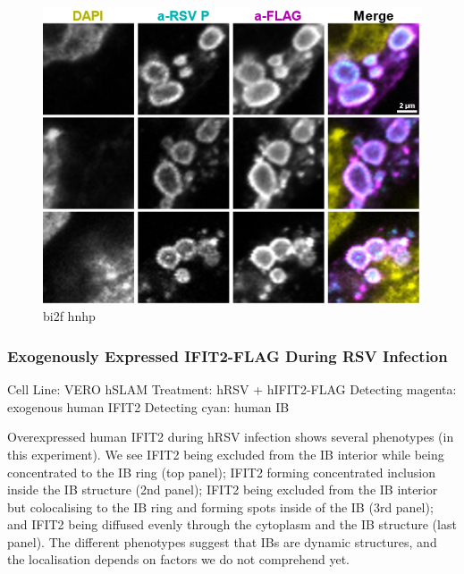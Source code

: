 \begin{figure}
    \centering
    \includegraphics[width=1\linewidth]{09. Chapter 4//Figs//03. IFIT2-FLAG/03. bi2f bnbp.png}
    \caption[bi2f hnhp]{bi2f hnhp}
    \label{bi2f hnhp}
\end{figure}

\subsubsection{Exogenously Expressed IFIT2-FLAG During RSV Infection} \label{Exogenously Expressed IFIT2-FLAG During RSV Infection}
Cell Line: VERO hSLAM \newline
Treatment: hRSV + hIFIT2-FLAG \newline
Detecting magenta: exogenous human IFIT2 \newline
Detecting cyan: human IB \newline

Overexpressed human IFIT2 during hRSV infection shows several phenotypes (in this experiment). We see IFIT2 being excluded from the IB interior while being concentrated to the IB ring (top panel); IFIT2 forming concentrated inclusion inside the IB structure (2nd panel); IFIT2 being excluded from the IB interior but colocalising to the IB ring and forming spots inside of the IB (3rd panel); and IFIT2 being diffused evenly through the cytoplasm and the IB structure (last panel). The different phenotypes suggest that IBs are dynamic structures, and the localisation depends on factors we do not comprehend yet. 

